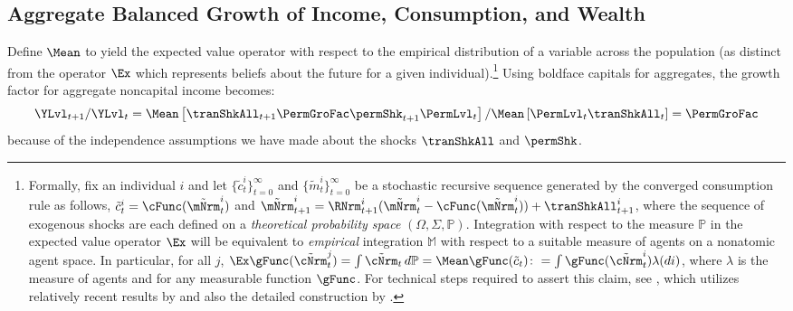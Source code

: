 \documentclass[BufferStockTheory]{subfiles}
\begin{document}
\hypertarget{Growth-Rates-of-Individual-Income-and-Consumption}{}
\subsection{Aggregate Balanced Growth of  Income, Consumption, and Wealth}\label{subsec:cGroEqPermGroFacQ}

Define $\Mean$ to yield the expected value operator with respect to the empirical distribution of a variable across the population (as distinct from the operator $\Ex$ which represents beliefs about the future for a given individual).\footnote{Formally, fix an individual $i$ and let $\{\tilde{c}^{i}_{t}\}_{t=0}^{\infty}$ and $\{\tilde{m}^{i}_{t}\}_{t=0}^{\infty}$ be a stochastic recursive sequence generated by the converged consumption rule as follows, $\tilde{c}^{i}_{t} = \cFunc(\tilde{\mNrm}^{i}_{t})$ and $\tilde{\mNrm}^{i}_{t+1} = \RNrm^{i}_{t+1}(\tilde{\mNrm}^{i}_{t} -\cFunc(\tilde{\mNrm}^{i}_{t})) + \tranShkAll^{i}_{t+1}$, where the sequence of exogenous shocks are each defined on a \textit{theoretical probability space} $(\Omega, \Sigma, \mathbb{P})$. Integration with respect to the measure $\mathbb{P}$ in the expected value operator $\Ex$ will be equivalent to \textit{empirical} integration $\mathbb{M}$ with respect to a suitable measure of agents on a nonatomic agent space. In particular, for all $j$, $\Ex\gFunc(\tilde{\cNrm}_{t}^{j})  = \int \tilde{\cNrm}_{t}\,d\mathbb{P} =  \Mean\gFunc(\tilde{c}_{t})\colon = \int \gFunc(\tilde{\cNrm}_{t}^{i}) \lambda(di)$, where $\lambda$ is the measure of agents and  for any measurable function $\gFunc$. For technical steps required to assert this claim, see \cite{Shanker2017a}, which utilizes  relatively recent results by \cite{Sun2009} and also the detailed construction by \cite{Cao2020}.} Using boldface capitals for aggregates, the growth factor for aggregate noncapital income becomes:
\begin{equation*}
  \YLvl_{t+1}/\YLvl_{t}  = \Mean\left[\tranShkAll_{t+1}\PermGroFac \permShk_{t+1}\PermLvl_{t}\right]/\Mean\left[\PermLvl_{t}\tranShkAll_{t}\right] = \PermGroFac
\end{equation*}
because of the independence assumptions we have made about the shocks $\tranShkAll$ and $\permShk$.
\end{document}

